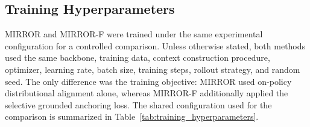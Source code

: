 \documentclass{article} %
\begin{document}
\subsection{Training Hyperparameters}
\label{app:training_hyperparameterss}

MIRROR and MIRROR-F were trained under the same experimental configuration
for a controlled comparison. Unless otherwise stated, both methods used the
same backbone, training data, context construction procedure, optimizer,
learning rate, batch size, training steps, rollout strategy, and random seed.
The only difference was the training objective: MIRROR used on-policy
distributional alignment alone, whereas MIRROR-F additionally applied the
selective grounded anchoring loss. The shared configuration used for the
comparison is summarized in Table~\ref{tab:training_hyperparameters}.
\end{document}

